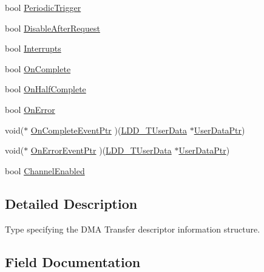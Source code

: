 \begin{DoxyCompactItemize}
\item 
bool \hyperlink{struct_l_d_d___d_m_a___t_transfer_descriptor_aa29036eb34e794f3abbfea02be51711f}{Periodic\+Trigger}
\item 
bool \hyperlink{struct_l_d_d___d_m_a___t_transfer_descriptor_af47462df9934c927bd3cb1c8c7a4aa94}{Disable\+After\+Request}
\item 
bool \hyperlink{struct_l_d_d___d_m_a___t_transfer_descriptor_a2dd483b9c7608a34cc231114f2642271}{Interrupts}
\item 
bool \hyperlink{struct_l_d_d___d_m_a___t_transfer_descriptor_a1b9c560066718de0c2e9b5e0c6b2a3c5}{On\+Complete}
\item 
bool \hyperlink{struct_l_d_d___d_m_a___t_transfer_descriptor_a27b37f43ef69a8644ec04166660a7c24}{On\+Half\+Complete}
\item 
bool \hyperlink{struct_l_d_d___d_m_a___t_transfer_descriptor_a3ddeb9c7243015b0ee7afd15235ce37b}{On\+Error}
\item 
void($\ast$ \hyperlink{struct_l_d_d___d_m_a___t_transfer_descriptor_a7a3c1cd12b7f66760b5d02989409ac48}{On\+Complete\+Event\+Ptr} )(\hyperlink{group___p_e___types__module_ga0b66a73f87238a782318aa0be7578e35}{L\+D\+D\+\_\+\+T\+User\+Data} $\ast$\hyperlink{struct_l_d_d___d_m_a___t_transfer_descriptor_a4136d6742944c7b04a94695c78b581b8}{User\+Data\+Ptr})
\item 
void($\ast$ \hyperlink{struct_l_d_d___d_m_a___t_transfer_descriptor_a9d97c36a86505594fd2642c1242f7460}{On\+Error\+Event\+Ptr} )(\hyperlink{group___p_e___types__module_ga0b66a73f87238a782318aa0be7578e35}{L\+D\+D\+\_\+\+T\+User\+Data} $\ast$\hyperlink{struct_l_d_d___d_m_a___t_transfer_descriptor_a4136d6742944c7b04a94695c78b581b8}{User\+Data\+Ptr})
\item 
bool \hyperlink{struct_l_d_d___d_m_a___t_transfer_descriptor_acf5f8fe95f319b19a591880ed8a7a3c0}{Channel\+Enabled}
\end{DoxyCompactItemize}


\subsection{Detailed Description}
Type specifying the D\+M\+A Transfer descriptor information structure. 

\subsection{Field Documentation}
\hypertarget{struct_l_d_d___d_m_a___t_transfer_descriptor_aff47307126179fdf6b241ca1b7371256}{}
